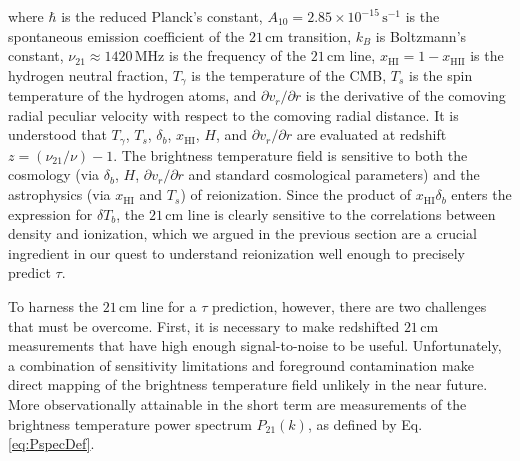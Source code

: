 \documentclass[twocolumn,aps,prd,nofootinbib,showpacs,superscriptaddress]{revtex4-1}
\begin{document}
where $\hbar$ is the reduced Planck's constant, $A_{10}=2.85\times10^{-15}\,\textrm{s}^{-1}$ is the spontaneous emission coefficient of the $21\,\textrm{cm}$ transition, $k_B$ is Boltzmann's constant, $\nu_\textrm{21} \approx 1420\,\textrm{MHz}$ is the frequency of the $21\,\textrm{cm}$ line, $x_\textrm{HI} = 1 - x_\textrm{HII}$ is the hydrogen neutral fraction, $T_\gamma$ is the temperature of the CMB, $T_s$ is the spin temperature of the hydrogen atoms, and $\partial v_r / \partial r$ is the derivative of the comoving radial peculiar velocity with respect to the comoving radial distance. It is understood that $T_\gamma$, $T_s$, $\delta_b$, $x_\textrm{HI}$, $H$, and $\partial v_r / \partial r$ are evaluated at redshift $z = (\nu_\textrm{21} / \nu ) -1$. The brightness temperature field is sensitive to both the cosmology (via $\delta_b$, $H$, $\partial v_r / \partial r$ and standard cosmological parameters) and the astrophysics (via $x_\textrm{HI}$ and $T_s$) of reionization. Since the product of $x_\textrm{HI} \delta_b$ enters the expression for $\delta T_b$, the $21\,\textrm{cm}$ line is clearly sensitive to the correlations between density and ionization, which we argued in the previous section are a crucial ingredient in our quest to understand reionization well enough to precisely predict $\tau$.

%

To harness the $21\,\textrm{cm}$ line for a $\tau$ prediction, however, there are two challenges that must be overcome. First, it is necessary to make redshifted $21\,\textrm{cm}$ measurements that have high enough signal-to-noise to be useful. Unfortunately, a combination of sensitivity limitations and foreground contamination make direct mapping of the brightness temperature field unlikely in the near future. More observationally attainable in the short term are measurements of the brightness temperature power spectrum $P_\textrm{21} (k)$, as defined by Eq. \eqref{eq:PspecDef}.
\end{document}
